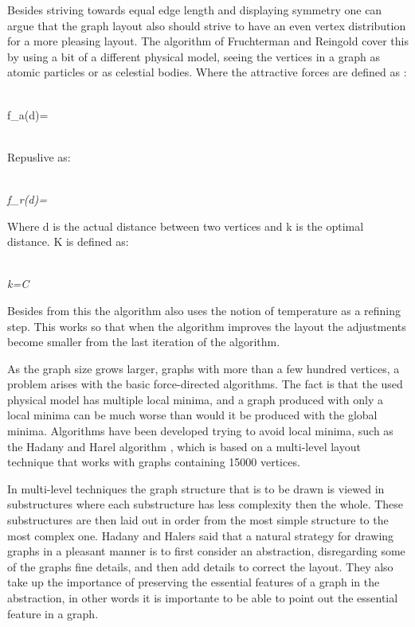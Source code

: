 \documentclass[a4paper,11pt]{kth-mag}
\begin{document}
Besides striving towards equal edge length and displaying symmetry one can argue that the graph layout also should strive to have an even vertex distribution for a more pleasing layout. The algorithm of Fruchterman and Reingold
cover this by using a bit of a different physical model, seeing the vertices in a graph as atomic particles or as celestial bodies. Where the attractive forces are defined as \cite{1338}:\\
\begin{mathsurround}
\\
\math f_{a}(d)=\\
\\
\end{mathsurround}
 Repuslive as:\\
\begin{mathsurround}
\\
\emph{\math f_{r}(d)=}
\\
\end{mathsurround}
Where d is the actual distance between two vertices and k is the optimal distance. K is defined as:\\
\begin{mathsurround}
\\
\emph{\math k=C}
\\
\end{mathsurround}

Besides from this the algorithm also uses the notion of temperature as a refining step. This works so that when the algorithm improves the layout the adjustments become smaller from the last iteration of the algorithm.
 
As the graph size grows larger, graphs with more than a few hundred vertices, a problem arises with the basic force-directed algorithms. The fact is that the used physical model has multiple local minima, and a graph produced
with only a local minima can be much worse than would it be produced with the global minima. Algorithms have been developed trying to avoid local minima, such as the Hadany and Harel algorithm \cite{handh}, which is based on
a multi-level layout technique that works with graphs containing 15000 vertices. 

In multi-level techniques the graph structure that is to be drawn is viewed in substructures where each substructure has less complexity then the whole. These substructures are then laid out in order from the most simple 
structure to the most complex one. Hadany and Halers \cite{handh} said that a natural strategy for drawing graphs in a pleasant manner is to first consider an abstraction, 
disregarding some of the graphs fine details, and then add details to correct the layout. They also take up the importance of preserving the essential features of a graph in the abstraction,
in other words it is importante to be able to point out the essential feature in a graph. 
\end{document}
